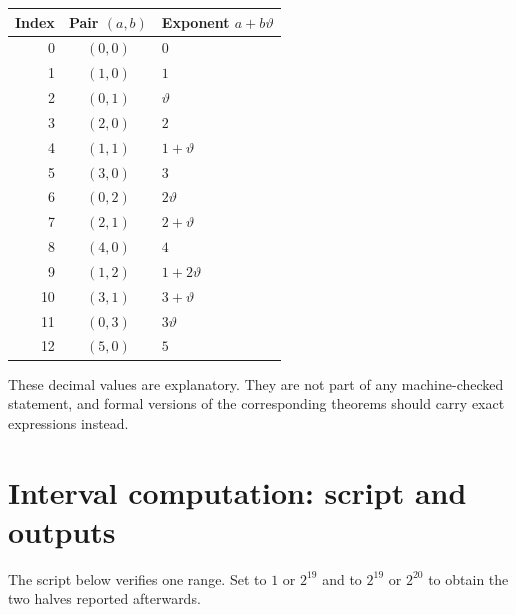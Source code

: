 \documentclass[11pt,oneside]{article}
\theoremstyle{definition}
\theoremstyle{remark}
\newcommand{\thetaq}{\vartheta}
\newcommand{\lean}[1]{\texttt{\detokenize{#1}}}
\begin{document}
\begin{center}
\small
\begin{tabular}{rcl}
\toprule
Index & Pair $(a,b)$ & Exponent $a+b\thetaq$ \\
\midrule
0 & $(0,0)$ & $0$ \\
1 & $(1,0)$ & $1$ \\
2 & $(0,1)$ & $\thetaq$ \\
3 & $(2,0)$ & $2$ \\
4 & $(1,1)$ & $1+\thetaq$ \\
5 & $(3,0)$ & $3$ \\
6 & $(0,2)$ & $2\thetaq$ \\
7 & $(2,1)$ & $2+\thetaq$ \\
8 & $(4,0)$ & $4$ \\
9 & $(1,2)$ & $1+2\thetaq$ \\
10 & $(3,1)$ & $3+\thetaq$ \\
11 & $(0,3)$ & $3\thetaq$ \\
12 & $(5,0)$ & $5$ \\
\bottomrule
\end{tabular}
\end{center}

These decimal values are explanatory.  They are not part of any machine-checked statement,
and formal versions of the corresponding theorems should carry exact expressions instead.

\section{Interval computation: script and outputs}
\label{app:interval}

The script below verifies one range.  Set \lean{START} to $1$ or $2^{19}$ and \lean{LIMIT} to
$2^{19}$ or $2^{20}$ to obtain the two halves reported afterwards.
\end{document}
